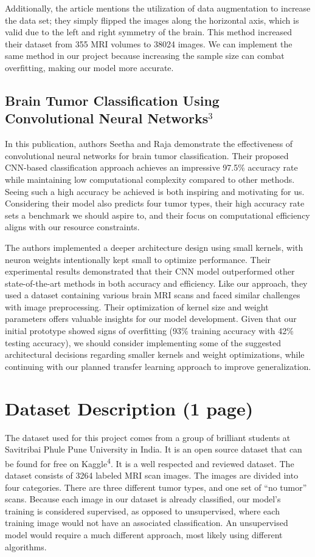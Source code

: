 \documentclass[conference]{IEEEtran}
\begin{document}
Additionally, the article mentions the utilization of data augmentation to increase the data set; they simply flipped the images along the horizontal axis, which is valid due to the left and right symmetry of the brain. This method increased their dataset from 355 MRI volumes to 38024 images. We can implement the same method in our project because increasing the sample size can combat overfitting, making our model more accurate.

\subsection{\large Brain Tumor Classification Using Convolutional Neural Networks$^{3}$}

In this publication, authors Seetha and Raja demonstrate the effectiveness of convolutional neural networks for brain tumor classification. Their proposed CNN-based classification approach achieves an impressive 97.5\% accuracy rate while maintaining low computational complexity compared to other methods. Seeing such a high accuracy be achieved is both inspiring and motivating for us. Considering their model also predicts four tumor types, their high accuracy rate sets a benchmark we should aspire to, and their focus on computational efficiency aligns with our resource constraints. 

The authors implemented a deeper architecture design using small kernels, with neuron weights intentionally kept small to optimize performance. Their experimental results demonstrated that their CNN model outperformed other state-of-the-art methods in both accuracy and efficiency. Like our approach, they used a dataset containing various brain MRI scans and faced similar challenges with image preprocessing. Their optimization of kernel size and weight parameters offers valuable insights for our model development. Given that our initial prototype showed signs of overfitting (93\% training accuracy with 42\% testing accuracy), we should consider implementing some of the suggested architectural decisions regarding smaller kernels and weight optimizations, while continuing with our planned transfer learning approach to improve generalization.


\section{\large Dataset Description (1 page)}

The dataset used for this project comes from a group of brilliant students at Savitribai Phule Pune University in India. It is an open source dataset that can be found for free on Kaggle\textsuperscript{4}. It is a well respected and reviewed dataset. The dataset consists of 3264 labeled MRI scan images. The images are divided into four categories. There are three different tumor types, and one set of “no tumor” scans. Because each image in our dataset is already classified, our model's training is considered supervised, as opposed to unsupervised, where each training image would not have an associated classification. An unsupervised model would require a much different approach, most likely using different algorithms.
\end{document}
